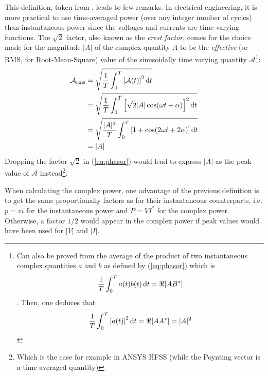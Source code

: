This definition, taken from \parencite{Harrington2001}, leads to few remarks. In electrical engineering, it is more practical to use time-averaged power (over any integer number of cycles) than instantaneous power since the voltages and currents are time-varying functions. The $\sqrt{2}$ factor, also known as the \emph{crest factor}, comes for the choice made for the magnitude $|A|$ of the complex quantity $A$ to be the \emph{effective} (or RMS, for Root-Mean-Square) value of the sinusoidally time varying quantity $\mathcal{A}$\footnote{Can also be proved from the average of the product of two instantaneous complex quantities $a$ and $b$ as defined by (\ref{eq:phasor}) which is  
$$ 
\frac{1}{T}  \int_0^T a(t) b(t)\mathop{}\!\mathrm{d} t = \Re[AB^*]
$$. Then, one deduces that 
$$
\frac{1}{T}  \int_0^T \left[a(t)\right]^2 \mathop{}\!\mathrm{d} t = \Re[AA^*] = |A|^2
$$}: 
\begin{subequations}
 \begin{align}
  \mathcal{A}_{\mathrm{rms}}
    &= \sqrt{\frac{1}{T} \int_0^T \left[\mathcal{A}(t) \right]^2 \mathop{}\!\mathrm{d} t}  \nonumber \\
    &= \sqrt{\frac{1}{T} \int_0^T  \left[\sqrt{2} |A| \cos (\omega t + \alpha) \right]^2 \mathop{}\!\mathrm{d} t} \nonumber \\
    &= \sqrt{\frac{|A|^2}{T} \int_0^T  \left[ 1+\cos (2\omega t + 2\alpha) \right] \mathop{}\!\mathrm{d} t} \nonumber \\
    &= |A| \nonumber
 \end{align}
\end{subequations}
Dropping the factor $\sqrt{2}$ in (\ref{eq:phasor}) would lead to express $|A|$ as the peak value of $\mathcal{A}$ instead\footnote{Which is the case for example in ANSYS HFSS (while the Poynting vector is a time-averaged quantity)}. 

When calculating the complex power, one advantage of the previous definition is to get the same proportionally factors as for their instantaneous counterparts, i.e. $p=v i$ for the instantaneous power and $P=VI^*$ for the complex power. Otherwise, a factor $1/2$ would appear in the complex power if peak values would have been used for $|V|$ and $|I|$.

